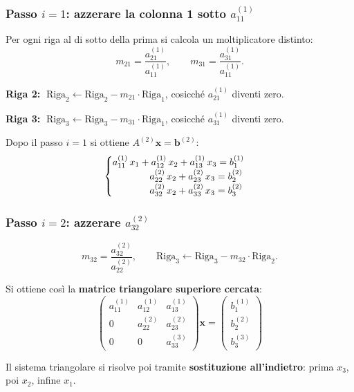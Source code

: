 \documentclass[a4paper,12pt]{article}
\theoremstyle{definition}
\theoremstyle{remark}
\begin{document}
\subsubsection*{Passo $i=1$: azzerare la colonna 1 sotto $a_{11}^{(1)}$}

Per ogni riga al di sotto della prima si calcola un moltiplicatore distinto:
\[
  m_{21} = \frac{a_{21}^{(1)}}{a_{11}^{(1)}}, \qquad
  m_{31} = \frac{a_{31}^{(1)}}{a_{11}^{(1)}}.
\]

\noindent\textbf{Riga 2:} $\;\text{Riga}_2 \leftarrow \text{Riga}_2 - m_{21}\cdot\text{Riga}_1$,
cosicché $a_{21}^{(1)}$ diventi zero.

\noindent\textbf{Riga 3:} $\;\text{Riga}_3 \leftarrow \text{Riga}_3 - m_{31}\cdot\text{Riga}_1$,
cosicché $a_{31}^{(1)}$ diventi zero.

Dopo il passo $i=1$ si ottiene $A^{(2)}\mathbf{x} = \mathbf{b}^{(2)}$:
\[
  \begin{cases}
    a_{11}^{(1)}\,x_1 + a_{12}^{(1)}\,x_2 + a_{13}^{(1)}\,x_3 = b_1^{(1)} \\
    \hphantom{a_{11}^{(1)}\,x_1 +}\; a_{22}^{(2)}\,x_2 + a_{23}^{(2)}\,x_3 = b_2^{(2)} \\
    \hphantom{a_{11}^{(1)}\,x_1 +}\; a_{32}^{(2)}\,x_2 + a_{33}^{(2)}\,x_3 = b_3^{(2)}
  \end{cases}
\]

\subsubsection*{Passo $i=2$: azzerare $a_{32}^{(2)}$}

\[
  m_{32} = \frac{a_{32}^{(2)}}{a_{22}^{(2)}}, \qquad
  \text{Riga}_3 \leftarrow \text{Riga}_3 - m_{32}\cdot\text{Riga}_2.
\]

Si ottiene così la \textbf{matrice triangolare superiore cercata}:
\[
  \begin{pmatrix}
    a_{11}^{(1)} & a_{12}^{(1)} & a_{13}^{(1)} \\
    0            & a_{22}^{(2)} & a_{23}^{(2)} \\
    0            & 0            & a_{33}^{(3)}
  \end{pmatrix}
  \mathbf{x} =
  \begin{pmatrix} b_1^{(1)} \\ b_2^{(2)} \\ b_3^{(3)} \end{pmatrix}
\]

Il sistema triangolare si risolve poi tramite \textbf{sostituzione
all'indietro}: prima $x_3$, poi $x_2$, infine $x_1$.
\end{document}
